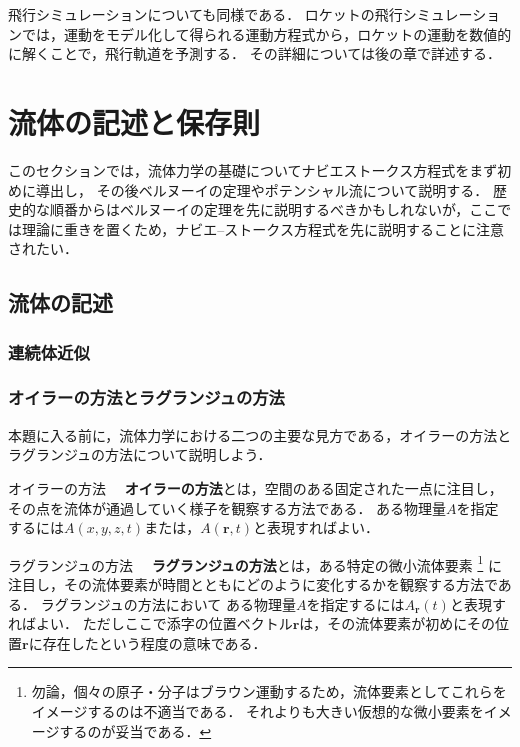 \documentclass[uplatex,dvipdfmx,a4j,11pt]{jsreport}
\newcommand{\keyword}[1]{\textcolor{mainblue}{\textbf{#1}}}
\numberwithin{equation}{chapter}
\begin{document}
\enskip

飛行シミュレーションについても同様である．
ロケットの飛行シミュレーションでは，運動をモデル化して得られる運動方程式から，ロケットの運動を数値的に解くことで，飛行軌道を予測する．
その詳細については後の章で詳述する．



\chapter{流体の記述と保存則}

このセクションでは，流体力学の基礎についてナビエストークス方程式をまず初めに導出し，
その後ベルヌーイの定理やポテンシャル流について説明する．
歴史的な順番からはベルヌーイの定理を先に説明するべきかもしれないが，ここでは理論に重きを置くため，ナビエ--ストークス方程式を先に説明することに注意されたい．

\enskip

\section{流体の記述}

\subsection{連続体近似}

\subsection{オイラーの方法とラグランジュの方法}

本題に入る前に，流体力学における二つの主要な見方である，オイラーの方法とラグランジュの方法について説明しよう．

\begin{definition}{オイラーの方法}{}{}
  　\keyword{オイラーの方法}とは，空間のある固定された一点に注目し，その点を流体が通過していく様子を観察する方法である．
  ある物理量$A$を指定するには$A(x,y,z,t)$または，$A(\mathbf{r},t)$と表現すればよい．
\end{definition}

\begin{definition}{ラグランジュの方法}{}{}
  　\keyword{ラグランジュの方法}とは，ある特定の微小流体要素
  \footnote{
  勿論，個々の原子・分子はブラウン運動するため，流体要素としてこれらをイメージするのは不適当である．
  それよりも大きい仮想的な微小要素をイメージするのが妥当である．
  }
  に注目し，その流体要素が時間とともにどのように変化するかを観察する方法である．
  ラグランジュの方法において
  ある物理量$A$を指定するには$A_{\mathbf{r}}(t)$と表現すればよい．
  ただしここで添字の位置ベクトル$\mathbf{r}$は，その流体要素が初めにその位置$\mathbf{r}$に存在したという程度の意味である．
\end{definition}
\end{document}
